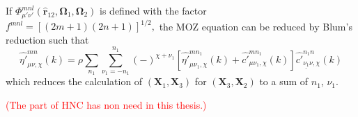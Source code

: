 If $\Phi_{\mu'\nu'}^{mnl}(\hat{\mathbf{r}}_{12},\mathbf{\Omega}_{1},\mathbf{\Omega}_{2})$
is defined with the factor $f^{mnl}=\left[(2m+1)(2n+1)\right]^{1/2},$
the \acs{MOZ} equation can be reduced by Blum's reduction such that
\begin{equation}
\hat{\eta'}_{\mu\nu,\chi}^{mn}(k)=\rho\sum_{n_{1}}\sum_{\nu_{1}=-n_{1}}^{n_{1}}(-)^{\chi+\nu_{1}}\left[\hat{\eta'}_{\mu\nu_{1},\chi}^{mn_{1}}(k)+\hat{c'}_{\mu\nu_{1},\chi}^{mn_{1}}(k)\right]\hat{c'}_{\underline{\nu_{1}}\nu,\chi}^{n_{1}n}(k)
\end{equation}
which reduces the calculation of $(\mathbf{X}_{1},\mathbf{X}_{3})$
for $(\mathbf{X}_{3},\mathbf{X}_{2})$ to a sum of $n_{1}$, $\nu_{1}$.

\textcolor{red}{(The part of HNC has non need in this thesis.)}
